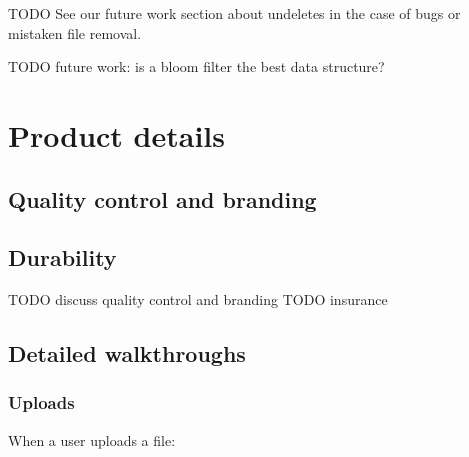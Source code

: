 \documentclass[11pt,fleqn,openany]{book}
\newcommand{\todo}[1]{{\color{red} TODO #1 }}
\begin{document}
\todo{See our future work section about undeletes in
the case of bugs or mistaken file removal.}

\todo{future work: is a bloom filter the best data structure?}

\chapter{Product details}\label{sec:product_details}

\section{Quality control and branding}
\section{Durability}

\todo{discuss quality control and branding}
\todo{insurance}

\section{Detailed walkthroughs}

\subsection{Uploads}

When a user uploads a file:
\end{document}
